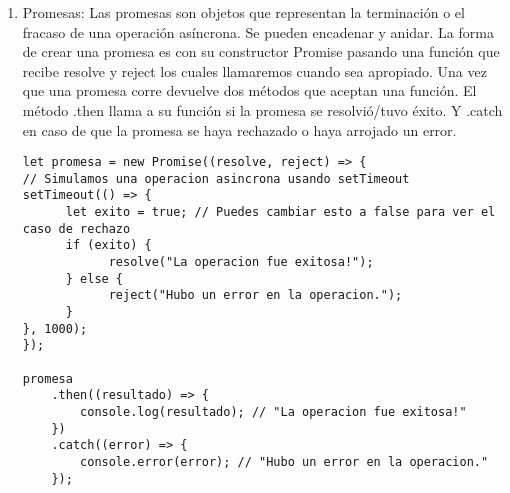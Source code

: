 \documentclass{article}
\begin{document}
\begin{enumerate}
      \item Promesas: Las promesas son objetos que representan la terminación
      o el fracaso de una operación asíncrona. Se pueden encadenar y
      anidar. La forma de crear una promesa es con su constructor Promise 
      pasando una función que recibe resolve y reject los cuales llamaremos 
      cuando sea apropiado. Una vez que una promesa corre devuelve dos 
      métodos que aceptan una función. El método .then llama a su función si 
      la promesa se resolvió/tuvo éxito. Y .catch en caso de que la
      promesa se haya rechazado o haya arrojado un error.

\begin{lstlisting}
let promesa = new Promise((resolve, reject) => {
// Simulamos una operacion asincrona usando setTimeout
setTimeout(() => {
      let exito = true; // Puedes cambiar esto a false para ver el caso de rechazo
      if (exito) {
            resolve("La operacion fue exitosa!");
      } else {
            reject("Hubo un error en la operacion.");
      }
}, 1000);
});

promesa
    .then((resultado) => {
        console.log(resultado); // "La operacion fue exitosa!"
    })
    .catch((error) => {
        console.error(error); // "Hubo un error en la operacion."
    });


\end{lstlisting}
      
\end{enumerate}
\end{document}
